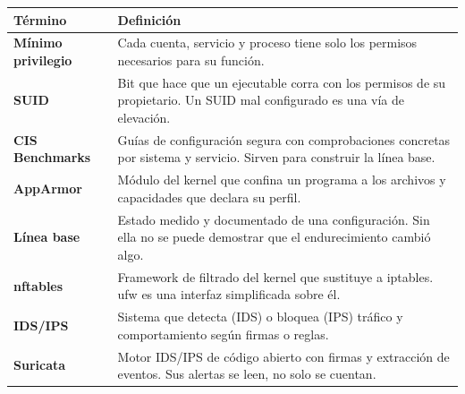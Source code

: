 \documentclass[11pt,a4paper]{article}
\begin{document}
\small
\begin{longtable}{@{}>{\raggedright\arraybackslash}p{4.2cm}>{\raggedright\arraybackslash}p{\dimexpr\linewidth-4.2cm-12pt\relax}@{}}
\toprule
\textbf{Término} & \textbf{Definición}\\
\midrule
\endhead
\bottomrule
\endlastfoot
\textbf{Mínimo privilegio} & Cada cuenta, servicio y proceso tiene solo los permisos necesarios para su función.\\
\textbf{SUID} & Bit que hace que un ejecutable corra con los permisos de su propietario. Un SUID mal configurado es una vía de elevación.\\
\textbf{CIS Benchmarks} & Guías de configuración segura con comprobaciones concretas por sistema y servicio. Sirven para construir la línea base.\\
\textbf{AppArmor} & Módulo del kernel que confina un programa a los archivos y capacidades que declara su perfil.\\
\textbf{Línea base} & Estado medido y documentado de una configuración. Sin ella no se puede demostrar que el endurecimiento cambió algo.\\
\textbf{nftables} & Framework de filtrado del kernel que sustituye a iptables. ufw es una interfaz simplificada sobre él.\\
\textbf{IDS/IPS} & Sistema que detecta (IDS) o bloquea (IPS) tráfico y comportamiento según firmas o reglas.\\
\textbf{Suricata} & Motor IDS/IPS de código abierto con firmas y extracción de eventos. Sus alertas se leen, no solo se cuentan.\\
\end{longtable}
\end{document}
